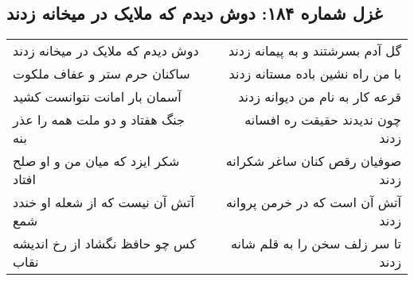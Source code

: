 \begin{center}
\section*{غزل شماره ۱۸۴: دوش دیدم که ملایک در میخانه زدند}
\label{sec:sh184}
\begin{longtable}{l p{0.5cm} r}
دوش دیدم که ملایک در میخانه زدند
&&
گل آدم بسرشتند و به پیمانه زدند
\\
ساکنان حرم ستر و عفاف ملکوت
&&
با من راه نشین باده مستانه زدند
\\
آسمان بار امانت نتوانست کشید
&&
قرعه کار به نام من دیوانه زدند
\\
جنگ هفتاد و دو ملت همه را عذر بنه
&&
چون ندیدند حقیقت ره افسانه زدند
\\
شکر ایزد که میان من و او صلح افتاد
&&
صوفیان رقص کنان ساغر شکرانه زدند
\\
آتش آن نیست که از شعله او خندد شمع
&&
آتش آن است که در خرمن پروانه زدند
\\
کس چو حافظ نگشاد از رخ اندیشه نقاب
&&
تا سر زلف سخن را به قلم شانه زدند
\\
\end{longtable}
\end{center}
